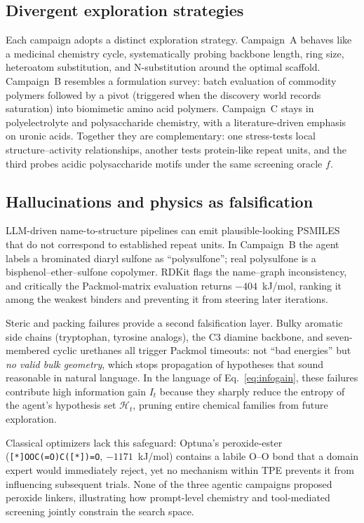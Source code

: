 \documentclass[twocolumn]{fairmeta}
\begin{document}
\subsection{Divergent exploration strategies}

Each campaign adopts a distinct exploration strategy.
Campaign~A behaves like a medicinal chemistry cycle, systematically probing backbone length, ring size, heteroatom substitution, and N-substitution around the optimal scaffold.
Campaign~B resembles a formulation survey: batch evaluation of commodity polymers followed by a pivot (triggered when the discovery world records saturation) into biomimetic amino acid polymers.
Campaign~C stays in polyelectrolyte and polysaccharide chemistry, with a literature-driven emphasis on uronic acids.
Together they are complementary: one stress-tests local structure--activity relationships, another tests protein-like repeat units, and the third probes acidic polysaccharide motifs under the same screening oracle $f$.

\subsection{Hallucinations and physics as falsification}
\label{sec:hallucination}

LLM-driven name-to-structure pipelines can emit plausible-looking PSMILES that do not correspond to established repeat units.
In Campaign~B the agent labels a brominated diaryl sulfone as ``polysulfone''; real polysulfone is a bisphenol--ether--sulfone copolymer.
RDKit flags the name--graph inconsistency, and critically the Packmol-matrix evaluation returns $-404$~kJ/mol, ranking it among the weakest binders and preventing it from steering later iterations.

Steric and packing failures provide a second falsification layer.
Bulky aromatic side chains (tryptophan, tyrosine analogs), the C3 diamine backbone, and seven-membered cyclic urethanes all trigger Packmol timeouts: not ``bad energies'' but \emph{no valid bulk geometry}, which stops propagation of hypotheses that sound reasonable in natural language.
In the language of Eq.~\ref{eq:infogain}, these failures contribute high information gain $I_t$ because they sharply reduce the entropy of the agent's hypothesis set $\mathcal{H}_t$, pruning entire chemical families from future exploration.

Classical optimizers lack this safeguard: Optuna's peroxide-ester (\texttt{[*]OOC(=O)C([*])=O}, $-1171$~kJ/mol) contains a labile O--O bond that a domain expert would immediately reject, yet no mechanism within TPE prevents it from influencing subsequent trials.
None of the three agentic campaigns proposed peroxide linkers, illustrating how prompt-level chemistry and tool-mediated screening jointly constrain the search space.
\end{document}
